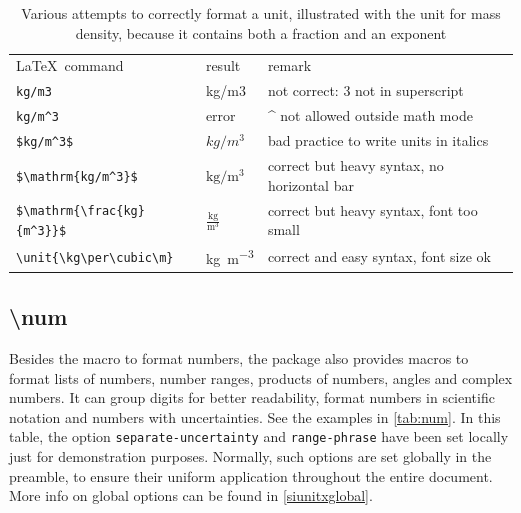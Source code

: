 \begin{table}\centering
    \caption{Various attempts to correctly format a unit, illustrated with the unit for mass density, because it contains both a fraction and an exponent}\label{tab:unitstrungle}
    \renewcommand{\arraystretch}{1.7} %
    \begin{tabular}{lll}
        \toprule
        \LaTeX\ command                    & result                        & remark \\[+1.5ex]
        \verb|kg/m3|                       & kg/m3                         & not correct: 3 not in superscript\\
        \verb|kg/m^3|                      & error                         & \^{} not allowed outside math mode \\
        \verb|$kg/m^3$|                    & $kg/m^3$                      & bad practice to write units in italics\\
        \verb|$\mathrm{kg/m^3}$|           & $\mathrm{kg/m^3}$             & correct but heavy syntax, no horizontal bar\\
        \verb|$\mathrm{\frac{kg}{m^3}}$|   & $\mathrm{\frac{kg}{m^3}}$     & correct but heavy syntax, font too small \\
        \verb|\unit{\kg\per\cubic\m}|      & \unit{\kg\per\cubic\m}        & correct and easy syntax, font size ok \\
        \bottomrule
    \end{tabular}
\end{table}

\subsection{\textbackslash num}
Besides the  macro to format numbers, the package also provides macros to format lists of numbers, number ranges, products of numbers, angles and complex numbers. It can group digits for better readability, format numbers in scientific notation and numbers with uncertainties. See the examples in \cref{tab:num}. In this table, the option \texttt{separate-uncertainty} and \texttt{range-phrase} have been set locally just for demonstration purposes. Normally, such options are set globally in the preamble, to ensure their uniform application throughout the entire document. More info on global options can be found in \cref{siunitxglobal}.

